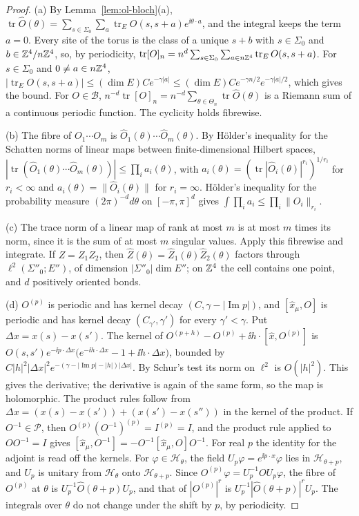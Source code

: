 \begin{proof}
(a) By Lemma~\ref{lem:ol-bloch}(a), $\operatorname{tr}\hat O(\theta)=\sum_{s\in\Sigma_0}\sum_a\operatorname{tr}_EO(s,s+a)e^{\ii\theta\cdot a}$, and the integral keeps the term $a=0$. Every site of the torus is the class of a unique $s+b$ with $s\in\Sigma_0$ and $b\in\mathbb Z^4/n\mathbb Z^4$, so, by periodicity, $\operatorname{tr}[O]_n=n^d\sum_{s\in\Sigma_0}\sum_{a\in n\mathbb Z^4}\operatorname{tr}_EO(s,s+a)$. For $s\in\Sigma_0$ and $0\ne a\in n\mathbb Z^4$, $|\operatorname{tr}_EO(s,s+a)|\le(\dim E)Ce^{-\gamma|a|}\le(\dim E)Ce^{-\gamma n/2}e^{-\gamma|a|/2}$, which gives the bound. For $O\in\mathscr B$, $n^{-d}\operatorname{tr}[O]_n=n^{-d}\sum_{\theta\in\Theta_n}\operatorname{tr}\hat O(\theta)$ is a Riemann sum of a continuous periodic function. The cyclicity holds fibrewise.

(b) The fibre of $O_1\cdots O_m$ is $\hat O_1(\theta)\cdots\hat O_m(\theta)$. By H\"older's inequality for the Schatten norms of linear maps between finite-dimensional Hilbert spaces, $|\operatorname{tr}(\hat O_1(\theta)\cdots\hat O_m(\theta))|\le\prod_ia_i(\theta)$, with $a_i(\theta)=(\operatorname{tr}|\hat O_i(\theta)|^{r_i})^{1/r_i}$ for $r_i<\infty$ and $a_i(\theta)=\|\hat O_i(\theta)\|$ for $r_i=\infty$. H\"older's inequality for the probability measure $(2\pi)^{-d}d\theta$ on $[-\pi,\pi]^d$ gives $\int\prod_ia_i\le\prod_i\|O_i\|_{r_i}$.

(c) The trace norm of a linear map of rank at most $m$ is at most $m$ times its norm, since it is the sum of at most $m$ singular values. Apply this fibrewise and integrate. If $Z=Z_1Z_2$, then $\hat Z(\theta)=\hat Z_1(\theta)\hat Z_2(\theta)$ factors through $\ell^2(\Sigma''_0;E'')$, of dimension $|\Sigma''_0|\dim E''$; on $\mathbb Z^4$ the cell contains one point, and $d$ positively oriented bonds.

(d) $O^{(p)}$ is periodic and has kernel decay $(C,\gamma-|\operatorname{Im}p|)$, and $[\hat x_\mu,O]$ is periodic and has kernel decay $(C_{\gamma'},\gamma')$ for every $\gamma'<\gamma$. Put $\Delta x=x(s)-x(s')$. The kernel of $O^{(p+h)}-O^{(p)}+\ii h\cdot[\hat x,O^{(p)}]$ is $O(s,s')e^{-\ii p\cdot\Delta x}\big(e^{-\ii h\cdot\Delta x}-1+\ii h\cdot\Delta x\big)$, bounded by $C|h|^2|\Delta x|^2e^{-(\gamma-|\operatorname{Im}p|-|h|)|\Delta x|}$. By Schur's test its norm on $\ell^2$ is $O(|h|^2)$. This gives the derivative; the derivative is again of the same form, so the map is holomorphic. The product rules follow from $\Delta x=(x(s)-x(s'))+(x(s')-x(s''))$ in the kernel of the product. If $O^{-1}\in\mathscr P$, then $O^{(p)}(O^{-1})^{(p)}=I^{(p)}=I$, and the product rule applied to $OO^{-1}=I$ gives $[\hat x_\mu,O^{-1}]=-O^{-1}[\hat x_\mu,O]O^{-1}$. For real $p$ the identity for the adjoint is read off the kernels. For $\varphi\in\mathcal H_\theta$, the field $U_p\varphi=e^{\ii p\cdot x}\varphi$ lies in $\mathcal H_{\theta+p}$, and $U_p$ is unitary from $\mathcal H_\theta$ onto $\mathcal H_{\theta+p}$. Since $O^{(p)}\varphi=U_p^{-1}OU_p\varphi$, the fibre of $O^{(p)}$ at $\theta$ is $U_p^{-1}\hat O(\theta+p)U_p$, and that of $|O^{(p)}|^r$ is $U_p^{-1}|\hat O(\theta+p)|^rU_p$. The integrals over $\theta$ do not change under the shift by $p$, by periodicity.
\end{proof}

